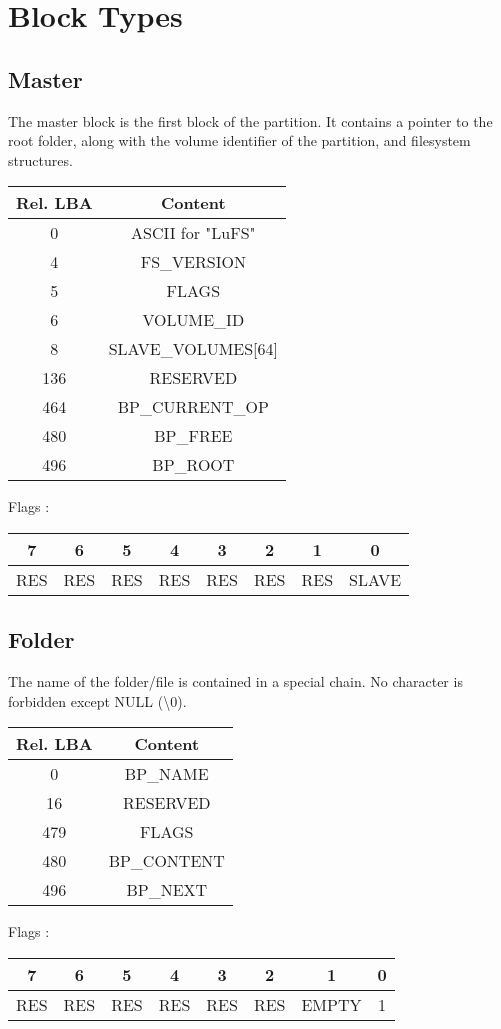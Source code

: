 \documentclass{article}
\begin{document}
\section{Block Types}
\subsection{Master}
The master block is the first block of the partition. It contains a pointer to the root folder, along with the volume identifier of the partition, and filesystem structures.
\newline
\begin{tabular}{|c|c|}
  \hline
  Rel. LBA & Content \\
  \hline
  0 & ASCII for "LuFS"  \\
  \hline
  4 &  FS\_VERSION \\
  \hline
  5 &  FLAGS \\
  \hline
  6 &  VOLUME\_ID \\
  \hline
  8 &  SLAVE\_VOLUMES[64] \\
  \hline
  136 & RESERVED \\
  \hline
  464 & BP\_CURRENT\_OP \\
  \hline
  480 & BP\_FREE \\
  \hline
  496 & BP\_ROOT \\
  \hline
  
\end{tabular}
\newline
Flags :
\begin{tabular}{|c|c|c|c|c|c|c|c|}
  \hline
  7 & 6 & 5 & 4 & 3 & 2 & 1 & 0 \\
  \hline
  RES & RES & RES & RES & RES & RES & RES & SLAVE  \\
  \hline
\end{tabular}
\subsection{Folder}
The name of the folder/file is contained in a special chain. No character is forbidden except NULL (\textbackslash0).
\newline
\begin{tabular}{|c|c|}
  \hline
  Rel. LBA & Content \\
  \hline
  0 & BP\_NAME \\
  \hline
  16 &  RESERVED \\
  \hline
  479 &  FLAGS \\
  \hline
  480 & BP\_CONTENT \\
  \hline
  496 & BP\_NEXT \\
  \hline
  
\end{tabular}
\newline
Flags :
\begin{tabular}{|c|c|c|c|c|c|c|c|}
  \hline
  7 & 6 & 5 & 4 & 3 & 2 & 1 & 0 \\
  \hline
  RES & RES & RES & RES & RES & RES & EMPTY & 1  \\
  \hline
\end{tabular}
\end{document}
